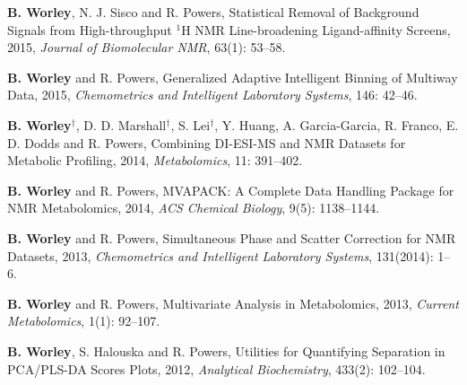 \documentclass[letterpaper]{article}
\renewenvironment{itemize}{
  \begin{list}{}{
    \setlength{\leftmargin}{1.5em}
  }
}{
  \end{list}
}
\begin{document}
\begin{itemize}
\item \textbf{B. Worley}, N. J. Sisco and R. Powers,
 Statistical Removal of Background Signals from High-throughput $^1$H NMR
 Line-broadening Ligand-affinity Screens, 2015,
 {\it Journal of Biomolecular NMR}, 63(1): 53--58.
\end{itemize}

\begin{itemize}
\item \textbf{B. Worley} and R. Powers,
 Generalized Adaptive Intelligent Binning of Multiway Data, 2015,
 {\it Chemometrics and Intelligent Laboratory Systems}, 146: 42--46.
\end{itemize}

\begin{itemize}
\item \textbf{B. Worley}$^\dagger$, D. D. Marshall$^\dagger$,
 S. Lei$^\dagger$, Y. Huang, A. Garcia-Garcia, R. Franco,
 E. D. Dodds and R. Powers, Combining DI-ESI-MS and NMR Datasets for
 Metabolic Profiling, 2014,
 {\it Metabolomics}, 11: 391--402.
\end{itemize}

\begin{itemize}
\item \textbf{B. Worley} and R. Powers,
 MVAPACK: A Complete Data Handling Package for NMR Metabolomics, 2014,
 {\it ACS Chemical Biology}, 9(5): 1138--1144.
\end{itemize}

\begin{itemize}
\item \textbf{B. Worley} and R. Powers,
 Simultaneous Phase and Scatter Correction for NMR Datasets, 2013,
 {\it Chemometrics and Intelligent Laboratory Systems}, 131(2014): 1--6.
\end{itemize}

\begin{itemize}
\item \textbf{B. Worley} and R. Powers,
 Multivariate Analysis in Metabolomics, 2013,
 {\it Current Metabolomics}, 1(1): 92--107.
\end{itemize}

\begin{itemize}
\item \textbf{B. Worley}, S. Halouska and R. Powers,
 Utilities for Quantifying Separation in PCA/PLS-DA Scores Plots, 2012,
 {\it Analytical Biochemistry}, 433(2): 102--104.
\end{itemize}
\end{document}
